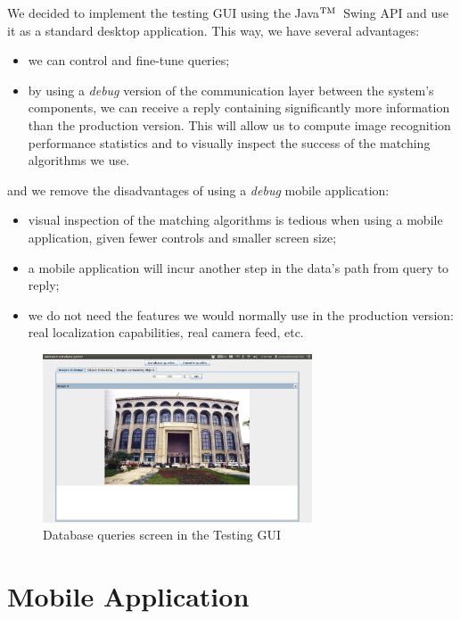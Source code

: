\documentclass[a4paper,onecolumn,oneside,titlepage,11pt]{report}
\def\tm{\leavevmode\hbox{$\rm {}^{TM}$}}
\begin{document}
We decided to implement the testing GUI using the Java\tm\ Swing API and use it as a standard desktop application. This way, we have several advantages:
\begin{itemize}
	\item we can control and fine-tune queries;
	\item by using a \emph{debug} version of the communication layer between the system's components, we can receive a reply containing significantly more information than the production version. This will allow us to compute image recognition performance statistics and to visually inspect the success of the matching algorithms we use.
\end{itemize}
and we remove the disadvantages of using a \emph{debug} mobile application:
\begin{itemize}
	\item visual inspection of the matching algorithms is tedious when using a mobile application, given fewer controls and smaller screen size;
	\item a mobile application will incur another step in the data's path from query to reply;
	\item we do not need the features we would normally use in the production version: real localization capabilities, real camera feed, etc.
\end{itemize}

\begin{figure}[H]
\begin{center}
\includegraphics[width=8cm]{../../images/testing_gui_database_queries.png}
\caption{Database queries screen in the Testing GUI}
\end{center}
\end{figure}

\section{Mobile Application}
\end{document}
